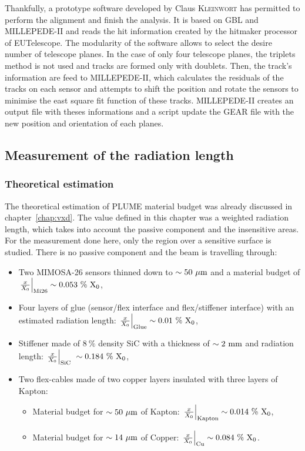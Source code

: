     Thankfully, a prototype software developed by Claus \textsc{Kleinwort} has permitted to perform the alignment and finish the analysis. 
    It is based on \gls{GBL} and MILLEPEDE-II and reads the hit information created by the hitmaker processor of EUTelescope. 
    The modularity of the software allows to select the desire number of telescope planes.
    In the case of only four telescope planes, the triplets method is not used and tracks are formed only with doublets.
    Then, the track's information are feed to MILLEPEDE-II, which calculates the residuals of the tracks on each sensor and attempts to shift the position and rotate the sensors to minimise the east square fit function of these tracks.
    MILLEPEDE-II creates an output file with theses informations and a script update the GEAR file with the new position and orientation of each planes.


   \subsection{Measurement of the radiation length}

     \subsubsection{Theoretical estimation}

     The theoretical estimation of \gls{PLUME} material budget was already discussed in chapter~\ref{chap:vxd}.
     The value defined in this chapter was a weighted radiation length, which takes into account the passive component and the insensitive areas.
     For the measurement done here, only the region over a sensitive surface is studied.
     There is no passive component and the beam is travelling through:
     
     \begin{itemize}
       \item Two \gls{MIMOSA}-26 sensors thinned down to $\sim 50~\rm{\mu m}$ and a material budget of $\left. \frac{x}{X_0} \right|_{\rm{Mi26}} \sim 0.053~\%~\rm{X_{0}}$,
       \item Four layers of glue (sensor/flex interface and flex/stiffener interface) with an estimated radiation length: $\left. \frac{x}{X_0} \right|_{\rm{Glue}} \sim 0.01~\%~\rm{X_0}$,
       \item Stiffener made of $8~\%$ density \gls{SiC} with a thickness of $\sim 2~\rm{mm}$ and radiation length: $\left. \frac{x}{X_0} \right|_{\rm{SiC}} ~\sim 0.184~\%~\rm{X_{0}}$,
       \item Two flex-cables made of two copper layers insulated with three layers of Kapton:
       \begin{itemize}
         \item Material budget for $\sim 50~\rm{\mu m}$ of Kapton: $\left. \frac{x}{X_0} \right|_{\rm{Kapton}} \sim 0.014~\%~\rm{X_{0}}$,
         \item Material budget for $\sim 14~\rm{\mu m}$ of Copper: $\left. \frac{x}{X_0} \right|_{\rm{Cu}} \sim 0.084~\%~\rm{X_{0}}$.
       \end{itemize}
     \end{itemize}

